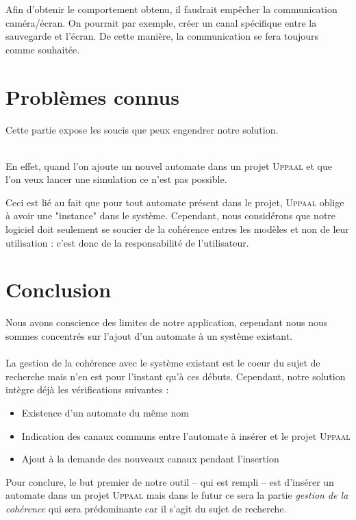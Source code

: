 \documentclass[12pt,a4paper]{report}
\begin{document}
    Afin d'obtenir le comportement obtenu, il faudrait empêcher la communication caméra/écran. On pourrait par exemple, créer un canal spécifique entre la sauvegarde et l'écran. De cette manière, la communication se fera toujours comme souhaitée.

\newpage
\section{Problèmes connus}
Cette partie expose les soucis que peux engendrer notre solution.
\\\

En effet, quand l'on ajoute un nouvel automate dans un projet \textsc{Uppaal} et que l'on veux lancer une simulation ce n'est pas possible.

Ceci est lié au fait que pour tout automate présent dans le projet, \textsc{Uppaal} oblige à avoir une "instance" dans le système. Cependant, nous considérons que notre logiciel doit seulement se soucier de la cohérence entres les modèles et non de leur utilisation : c'est donc de la responsabilité de l'utilisateur.

\section{Conclusion}
    Nous avons conscience des limites de notre application, cependant nous nous sommes concentrés sur l'ajout d'un automate à un système existant.
\\\\
    La gestion de la cohérence avec le système existant est le coeur du sujet de recherche mais n'en est pour l'instant qu'à ces débuts. Cependant, notre solution intègre déjà les vérifications suivantes :
    
    \begin{itemize}
    \item Existence d'un automate du même nom
    \item Indication des canaux communs entre l'automate à insérer et le projet \textsc{Uppaal}
    \item Ajout à la demande des nouveaux canaux pendant l'insertion
    \end{itemize}
    
Pour conclure, le but premier de notre outil -- qui est rempli --  est d'insérer un automate dans un projet \textsc{Uppaal} mais dans le futur ce sera la partie \emph{gestion de la cohérence} qui sera prédominante car il s'agit du sujet de recherche.
\end{document}
